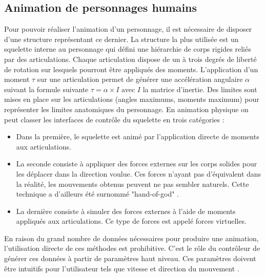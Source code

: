 \documentclass[runningheads,a4paper]{llncs}
\begin{document}
\subsection{Animation de personnages humains} 
Pour pouvoir réaliser l'animation d'un personnage, il est nécessaire de disposer d'une structure représentant ce dernier. La structure la plus utilisée est un squelette interne au personnage qui défini une hiérarchie de corps rigides reliés par des articulations. Chaque articulation dispose de un à trois degrés de liberté de rotation sur lesquels pourront être appliqués des moments. L'application d'un moment $\tau$ sur une articulation permet de générer une accélération angulaire $\alpha$ suivant la formule suivante $\tau=\alpha \times I$ avec $I$ la matrice d'inertie. Des limites sont mises en place sur les articulations (angles maximums, moments maximum) pour représenter les limites anatomiques du personnage. 
 En animation physique on peut classer les interfaces de contrôle du squelette en trois catégories \cite{geijtenbeek2012interactive}:
\begin{itemize}
\item{Dans la première, le squelette est animé par l'application directe de moments aux articulations.}
\item{La seconde consiste à appliquer des forces externes sur les corps solides pour les déplacer dans la direction voulue. Ces forces n'ayant pas d'équivalent dans la réalité, les mouvements obtenus peuvent ne pas sembler naturels. Cette technique a d'ailleurs été surnommé "hand-of-god" \cite{van1995guided}. }
\item{La dernière consiste à simuler des forces externes à l'aide de moments appliqués aux articulations. Ce type de forces est appelé forces virtuelles.}
\end{itemize}

En raison du grand nombre de données nécessaires pour produire une animation, l'utilisation directe de ces méthodes est prohibitive. C'est le rôle du contrôleur de générer ces données à partir de paramètres haut niveau. Ces paramètres doivent être intuitifs pour l'utilisateur tels que vitesse et direction du mouvement \cite{coros2010generalized}. 
\end{document}
